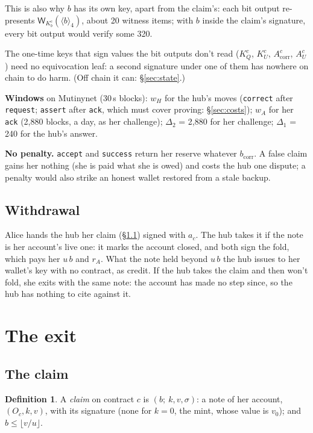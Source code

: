 \documentclass[11pt]{article}
\theoremstyle{plain}
\theoremstyle{definition}
\newtheorem{definition}{Definition}
\newcommand{\bcorr}{b_{\mathrm{corr}}}
\newcommand{\tx}[1]{\texttt{#1}}
\newcommand{\be}[2]{\langle #1\rangle_{#2}}
\newcommand{\Wots}{\mathsf{W}}
\newcommand{\Oc}{O_c}
\newcommand{\KQ}{K_{Q}^{c}}
\newcommand{\Kb}{K_{b}^{c}}
\newcommand{\KU}{K_{U}^{c}}
\newcommand{\Acorr}{A_{\mathrm{corr}}^{c}}
\newcommand{\AU}{A_{U}^{c}}
\begin{document}
This is also why $b$ has its own key, apart from the claim's: each bit
output re-presents $\Wots_{\Kb}(\be{b}{4})$, about 20 witness items;
with $b$ inside the claim's signature, every bit output would verify
some 320.

The one-time keys that sign values the bit outputs don't read ($\KQ$,
$\KU$, $\Acorr$, $\AU$) need no equivocation leaf: a second signature
under one of them has nowhere on chain to do harm. (Off chain it can:
\S\ref{sec:state}.)

\textbf{Windows} on Mutinynet (30\,s blocks): $w_H$ for the hub's moves
(\tx{correct} after \tx{request}; \tx{assert} after \tx{ack}, which must
cover proving: \S\ref{sec:costs}); $w_A$ for her \tx{ack} (2,880 blocks,
a day, as her challenge); $\Delta_2$ = 2,880 for her challenge;
$\Delta_1$ = 240 for the hub's answer.

\textbf{No penalty.} \tx{accept} and \tx{success} return her reserve
whatever $\bcorr$. A false claim gains her nothing (she is paid what she
is owed) and costs the hub one dispute; a penalty would also strike an
honest wallet restored from a stale backup.

\subsection{Withdrawal}\label{sec:withdrawal}

Alice hands the hub her claim (\S\ref{sec:claim}) signed with $a_c$.
The hub takes it if the note is her account's live one: it marks the
account closed, and both sign the fold, which pays her $u\,b$ and $r_A$.
What the note held beyond $u\,b$ the hub issues to her wallet's key with
no contract, as credit. If the hub takes the claim and then won't fold,
she exits with the same note: the account has made no step since, so
the hub has nothing to cite against it.

\section{The exit}\label{sec:exit}

\subsection{The claim}\label{sec:claim}

\begin{definition}
A \emph{claim} on contract $c$ is $(b;\ k, v, \sigma)$: a note of her
account, $(\Oc, k, v)$, with its signature (none for $k = 0$, the mint,
whose value is $v_0$); and $b \le \lfloor v/u \rfloor$.
\end{definition}
\end{document}
